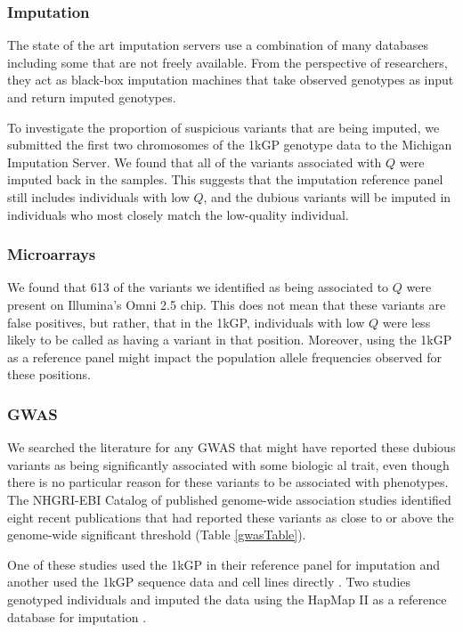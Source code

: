 \documentclass[9pt,lineno]{elife}
\begin{document}
\subsubsection{Imputation}

The state of the art imputation servers use a combination of many databases including some that are not freely available.
From the perspective of researchers, they act as black-box imputation machines that take observed genotypes as input and return imputed genotypes.  

To investigate the proportion of suspicious variants that are being imputed, we submitted the first two chromosomes of  the 1kGP genotype data to the Michigan Imputation Server.
We found that all of the variants associated with $Q$ were imputed back in the samples.
This suggests that the imputation reference panel still includes individuals with low $Q$, and the dubious variants will be imputed in individuals who most closely match the low-quality individual.

\subsubsection{Microarrays}

We found that 613 of the variants we identified as being associated to $Q$ were present on Illumina's Omni 2.5 chip. This does not mean that these variants are false positives, but rather, that in the 1kGP, individuals with low $Q$ were less likely to be called as having a variant in that position. Moreover, using the 1kGP as a reference panel might impact the population allele frequencies observed for these positions.

\subsubsection{GWAS}

We searched the literature for any GWAS that might have reported these dubious variants as being significantly associated with some biologic al trait, even though there is no particular reason for these variants to be associated with phenotypes.
The NHGRI-EBI Catalog of published genome-wide association studies identified eight recent publications that had reported these variants as close to or above the genome-wide significant threshold (Table \ref{gwasTable}).

One of these studies used the 1kGP in their reference panel for imputation \citep{tian2017genome} and another used the 1kGP sequence data and cell lines directly \citep{Mandage2017}.
Two studies genotyped individuals and imputed the data using the HapMap II as a reference  database for imputation \citep{Kraja2011, Ebejer2013}.
\end{document}
